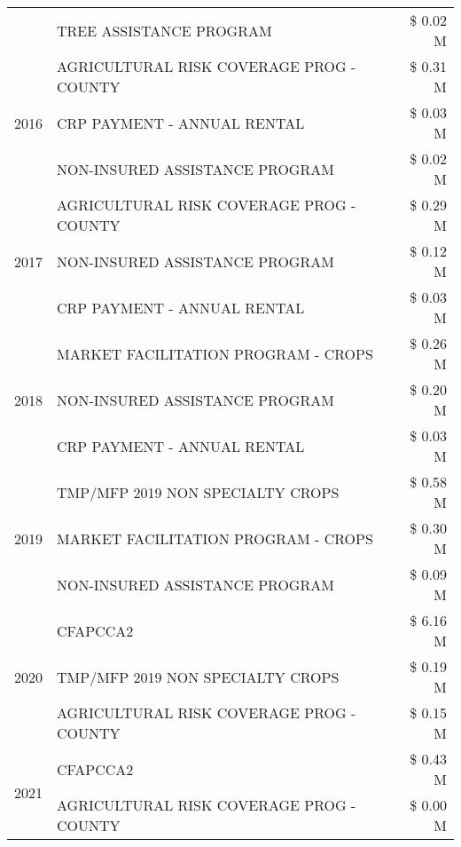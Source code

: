 \begin{tabular}{llr}
 & TREE ASSISTANCE PROGRAM & \$ 0.02 M \\
\cline{1-3}
\multirow[t]{3}{*}{2016} & AGRICULTURAL RISK COVERAGE PROG - COUNTY & \$ 0.31 M \\
 & CRP PAYMENT - ANNUAL RENTAL & \$ 0.03 M \\
 & NON-INSURED ASSISTANCE PROGRAM & \$ 0.02 M \\
\cline{1-3}
\multirow[t]{3}{*}{2017} & AGRICULTURAL RISK COVERAGE PROG - COUNTY & \$ 0.29 M \\
 & NON-INSURED ASSISTANCE PROGRAM & \$ 0.12 M \\
 & CRP PAYMENT - ANNUAL RENTAL & \$ 0.03 M \\
\cline{1-3}
\multirow[t]{3}{*}{2018} & MARKET FACILITATION PROGRAM - CROPS & \$ 0.26 M \\
 & NON-INSURED ASSISTANCE PROGRAM & \$ 0.20 M \\
 & CRP PAYMENT - ANNUAL RENTAL & \$ 0.03 M \\
\cline{1-3}
\multirow[t]{3}{*}{2019} & TMP/MFP 2019 NON SPECIALTY CROPS & \$ 0.58 M \\
 & MARKET FACILITATION PROGRAM - CROPS & \$ 0.30 M \\
 & NON-INSURED ASSISTANCE PROGRAM & \$ 0.09 M \\
\cline{1-3}
\multirow[t]{3}{*}{2020} & CFAPCCA2 & \$ 6.16 M \\
 & TMP/MFP 2019 NON SPECIALTY CROPS & \$ 0.19 M \\
 & AGRICULTURAL RISK COVERAGE PROG - COUNTY & \$ 0.15 M \\
\cline{1-3}
\multirow[t]{2}{*}{2021} & CFAPCCA2 & \$ 0.43 M \\
 & AGRICULTURAL RISK COVERAGE PROG - COUNTY & \$ 0.00 M \\
\cline{1-3}
\bottomrule
\end{tabular}
